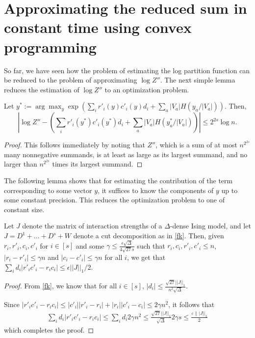 \documentclass[final, 12pt]{colt2018}
\newcommand{\eps}{\varepsilon}
\theoremstyle{definition}
\theoremstyle{plain}
\begin{document}
\section{Approximating the reduced sum in constant time using convex programming}
So far, we have seen how the problem of estimating the log partition function can be reduced to the problem of approximating $\log Z''$. 
The next simple lemma reduces the estimation of $\log{Z''}$ to an optimization problem.
\begin{lemma}\label{approx-sum-by-max}
Let $y^{\ast}:=\arg\max_{y}\exp\left(\sum_{i}r'_i(y)c'_i(y)d_{i}+\sum_{a}|V_{a}|H(y_{a}/|V_{a}|)\right)$.
Then, 
\[
\left|\log Z''-\left(\sum_{i}r'_i(y^{\ast})c'_i(y^{\ast})d_{i}+\sum_{a}|V_{a}|H(y_{a}^{\ast}/|V_{a}|)\right)\right|\leq2^{2s}\log n.
\]
\end{lemma}
\begin{proof}
This follows immediately by noting that $Z''$, which is a sum of at most $n^{2^{2s}}$ many nonnegative summands, is at least as large as its largest summand, and no larger than $n^{2^{2s}}$ times its largest summand. 
\end{proof}
The following lemma shows that for estimating the contribution of the term corresponding to some vector $y$, it suffices to know the components of $y$ up to some constant precision. This reduces the optimization problem to one of constant size.  
\begin{lemma}\label{lemma:gamma-def}
Let $J$ denote the matrix of interaction strengths of a $\Delta$-dense Ising model, and let $J = D^{1}+\dots+D^{s} + W$ denote a cut decomposition as in \cref{fk}. Then, given $r_{i},r'_{i},c_{i},c'_{i}$ for $i\in[s]$ and some 
$\gamma \le \frac{\epsilon \sqrt{\Delta}}{4 \sqrt{27} s}$ such that $r_i,c_i,r'_i,c'_i \le n$, 
$|r_i - r'_i| \le \gamma n$ and $|c_i - c'_i| \le \gamma n$ 
for all $i$, we get that 
$\sum_i d_i|r'_i c'_i - r_i c_i| \le \epsilon ||J||_{1}/2$. 
\end{lemma}
\begin{proof}
From \cref{fk}, we know that for all $i\in[s]$,  
$|d_i| \le \frac{\sqrt{27} ||J||_{1}}{n^2 \sqrt{\Delta}}$.
\iffalse
so using that $|R_t| \le n, |C_t| \le n$ we see that if we estimate
the number of $+$ and $-$ in $R_t,C_t$ within an additive error of $\gamma n$,
\fi
Since $ |r'_i c'_i - r_i c_i| \le |c'_i||r'_i - r_i| + |r_i||c'_i - c_i| \le 2\gamma n^2$, it follows that
\begin{align*}
\sum_i d_i|r'_i c'_i - r_i c_i|
\le \sum_i d_i 2\gamma n^2
\le \frac{\sqrt{27} ||J||_{1} }{\sqrt{\Delta}} 2\gamma s
\le %
\frac{\eps \||J||_{1}}{2}
\end{align*} which completes the proof. 
\end{proof}
\end{document}
